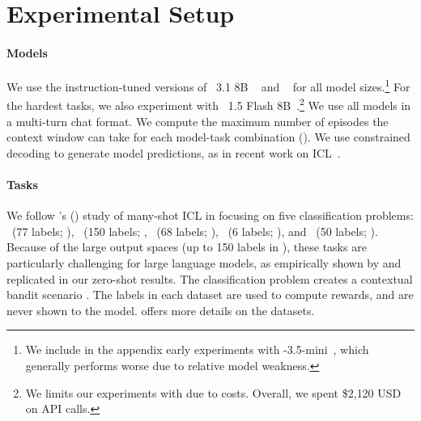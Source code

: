

\section{Experimental Setup}\label{sec:exp}

\paragraph{Models}

We use the instruction-tuned versions of \llama{}~3.1 8B ~\citep{dubey2024llama} and ~\citep{qwen2024qwen25} for all model sizes.\footnote{We include in the appendix early experiments with  \phillm{}-3.5-mini~\citep{abdin2024phi3technicalreporthighly}, which generally performs worse due to relative model weakness.} %
For the hardest tasks, we also experiment with \gemini~1.5 Flash 8B~\citep{geminiteam2024geminifamilyhighlycapable}.\footnote{We limits our experiments with \gemini due to costs. Overall, we spent \$2{,}120 USD on \gemini API calls.}
We use all models in a multi-turn chat format. 
We compute the maximum number of episodes the context window can take for each model-task combination ().
We use constrained decoding to generate model predictions, as in recent work on ICL~\citep{bertsch2024incontext}. 




\paragraph{Tasks}

We follow \citeauthor{bertsch2024incontext}'s (\citeyear{bertsch2024incontext}) study of many-shot ICL in focusing on five classification problems: \banking~(77 labels; \citealp{Casanueva2020}), \clinic~(150 labels; \citealp{larson-etal-2019-evaluation}, \nlu~(68 labels; \citealp{Liu2021}), \trec~(6 labels; \citealp{li-roth-2002-learning, hovy-etal-2001-toward}), and \trecfine~(50 labels; \citealp{li-roth-2002-learning, hovy-etal-2001-toward}). 
Because of the large output spaces (up to 150 labels in \clinic), these tasks are particularly challenging for large language models, as empirically shown by \citet{bertsch2024incontext} and replicated in our zero-shot results.
The classification problem creates a contextual bandit scenario \citep{pmlr-v97-zhang19b, bietti2021contextual}. The labels in each dataset are used to compute rewards, and are never shown to the model. 
 offers more details on the datasets.



